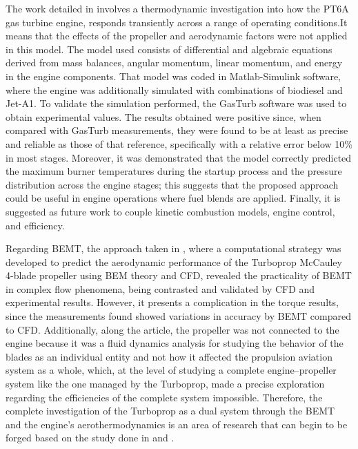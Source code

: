\documentclass{Format}
\begin{document}
The work detailed in \cite{Castellanos2019,Bayona2019PT6A} involves a thermodynamic investigation into how the PT6A gas turbine engine, responds transiently across a range of operating conditions.It means that the effects of the propeller and aerodynamic factors were not applied in this model. The model used consists of differential and algebraic equations derived from mass balances, angular momentum, linear momentum, and energy in the engine components. That model was coded in Matlab-Simulink software, where the engine was additionally simulated with combinations of biodiesel and Jet-A1. To validate the simulation performed, the GasTurb software was used to obtain experimental values. The results obtained were positive since, when compared with GasTurb measurements, they were found to be at least as precise and reliable as those of that reference, specifically with a relative error below 10\% in most stages. Moreover, it was demonstrated that the model correctly predicted the maximum burner temperatures during the startup process and the pressure distribution across the engine stages; this suggests that the proposed approach could be useful in engine operations where fuel blends are applied. Finally, it is suggested as future work to couple kinetic combustion models, engine control, and efficiency.

Regarding BEMT, the approach taken in \cite{Castellanos2023Propeller}, where a computational strategy was developed to predict the aerodynamic performance of the Turboprop McCauley 4-blade propeller using BEM theory and CFD, revealed the practicality of BEMT in complex flow phenomena, being contrasted and validated by CFD and experimental results. However, it presents a complication in the torque results, since the measurements found showed variations in accuracy by BEMT compared to CFD. Additionally, along the article, the propeller was not connected to the engine because it was a fluid dynamics analysis for studying the behavior of the blades as an individual entity and not how it affected the propulsion aviation system as a whole, which, at the level of studying a complete engine–propeller system like the one managed by the Turboprop, made a precise exploration regarding the efficiencies of the complete system impossible. Therefore, the complete investigation of the Turboprop as a dual system through the BEMT and the engine's aerothermodynamics is an area of research that can begin to be forged based on the study done in \cite{Castellanos2019,Bayona2019PT6A} and \cite{Castellanos2023Propeller}.
\end{document}
